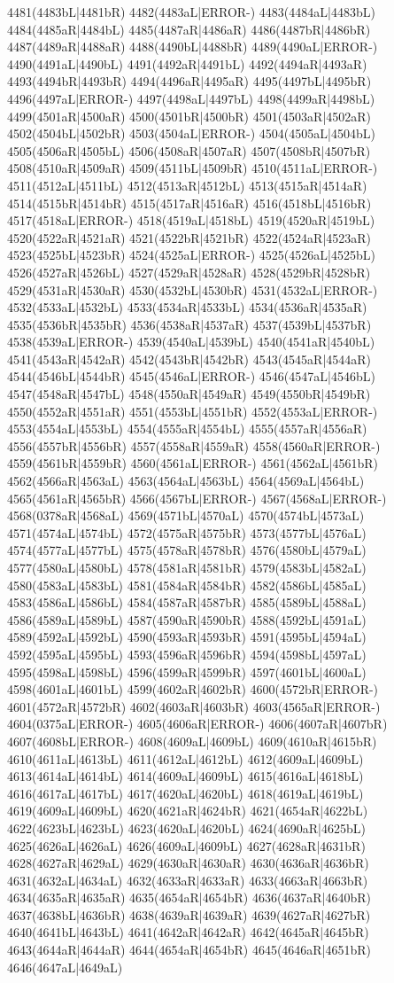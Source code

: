4481(4483bL|4481bR) 4482(4483aL|ERROR-) 4483(4484aL|4483bL) 4484(4485aR|4484bL) 4485(4487aR|4486aR) 4486(4487bR|4486bR) 4487(4489aR|4488aR) 4488(4490bL|4488bR) 4489(4490aL|ERROR-) 4490(4491aL|4490bL) 4491(4492aR|4491bL) 4492(4494aR|4493aR) 4493(4494bR|4493bR) 4494(4496aR|4495aR) 4495(4497bL|4495bR) 4496(4497aL|ERROR-) 4497(4498aL|4497bL) 4498(4499aR|4498bL) 4499(4501aR|4500aR) 4500(4501bR|4500bR) 4501(4503aR|4502aR) 4502(4504bL|4502bR) 4503(4504aL|ERROR-) 4504(4505aL|4504bL) 4505(4506aR|4505bL) 4506(4508aR|4507aR) 4507(4508bR|4507bR) 4508(4510aR|4509aR) 4509(4511bL|4509bR) 4510(4511aL|ERROR-) 4511(4512aL|4511bL) 4512(4513aR|4512bL) 4513(4515aR|4514aR) 4514(4515bR|4514bR) 4515(4517aR|4516aR) 4516(4518bL|4516bR) 4517(4518aL|ERROR-) 4518(4519aL|4518bL) 4519(4520aR|4519bL) 4520(4522aR|4521aR) 4521(4522bR|4521bR) 4522(4524aR|4523aR) 4523(4525bL|4523bR) 4524(4525aL|ERROR-) 4525(4526aL|4525bL) 4526(4527aR|4526bL) 4527(4529aR|4528aR) 4528(4529bR|4528bR) 4529(4531aR|4530aR) 4530(4532bL|4530bR) 4531(4532aL|ERROR-) 4532(4533aL|4532bL) 4533(4534aR|4533bL) 4534(4536aR|4535aR) 4535(4536bR|4535bR) 4536(4538aR|4537aR) 4537(4539bL|4537bR) 4538(4539aL|ERROR-) 4539(4540aL|4539bL) 4540(4541aR|4540bL) 4541(4543aR|4542aR) 4542(4543bR|4542bR) 4543(4545aR|4544aR) 4544(4546bL|4544bR) 4545(4546aL|ERROR-) 4546(4547aL|4546bL) 4547(4548aR|4547bL) 4548(4550aR|4549aR) 4549(4550bR|4549bR) 4550(4552aR|4551aR) 4551(4553bL|4551bR) 4552(4553aL|ERROR-) 4553(4554aL|4553bL) 4554(4555aR|4554bL) 4555(4557aR|4556aR) 4556(4557bR|4556bR) 4557(4558aR|4559aR) 4558(4560aR|ERROR-) 4559(4561bR|4559bR) 4560(4561aL|ERROR-) 4561(4562aL|4561bR) 4562(4566aR|4563aL) 4563(4564aL|4563bL) 4564(4569aL|4564bL) 4565(4561aR|4565bR) 4566(4567bL|ERROR-) 4567(4568aL|ERROR-) 4568(0378aR|4568aL) 4569(4571bL|4570aL) 4570(4574bL|4573aL) 4571(4574aL|4574bL) 4572(4575aR|4575bR) 4573(4577bL|4576aL) 4574(4577aL|4577bL) 4575(4578aR|4578bR) 4576(4580bL|4579aL) 4577(4580aL|4580bL) 4578(4581aR|4581bR) 4579(4583bL|4582aL) 4580(4583aL|4583bL) 4581(4584aR|4584bR) 4582(4586bL|4585aL) 4583(4586aL|4586bL) 4584(4587aR|4587bR) 4585(4589bL|4588aL) 4586(4589aL|4589bL) 4587(4590aR|4590bR) 4588(4592bL|4591aL) 4589(4592aL|4592bL) 4590(4593aR|4593bR) 4591(4595bL|4594aL) 4592(4595aL|4595bL) 4593(4596aR|4596bR) 4594(4598bL|4597aL) 4595(4598aL|4598bL) 4596(4599aR|4599bR) 4597(4601bL|4600aL) 4598(4601aL|4601bL) 4599(4602aR|4602bR) 4600(4572bR|ERROR-) 4601(4572aR|4572bR) 4602(4603aR|4603bR) 4603(4565aR|ERROR-) 4604(0375aL|ERROR-) 4605(4606aR|ERROR-) 4606(4607aR|4607bR) 4607(4608bL|ERROR-) 4608(4609aL|4609bL) 4609(4610aR|4615bR) 4610(4611aL|4613bL) 4611(4612aL|4612bL) 4612(4609aL|4609bL) 4613(4614aL|4614bL) 4614(4609aL|4609bL) 4615(4616aL|4618bL) 4616(4617aL|4617bL) 4617(4620aL|4620bL) 4618(4619aL|4619bL) 4619(4609aL|4609bL) 4620(4621aR|4624bR) 4621(4654aR|4622bL) 4622(4623bL|4623bL) 4623(4620aL|4620bL) 4624(4690aR|4625bL) 4625(4626aL|4626aL) 4626(4609aL|4609bL) 4627(4628aR|4631bR) 4628(4627aR|4629aL) 4629(4630aR|4630aR) 4630(4636aR|4636bR) 4631(4632aL|4634aL) 4632(4633aR|4633aR) 4633(4663aR|4663bR) 4634(4635aR|4635aR) 4635(4654aR|4654bR) 4636(4637aR|4640bR) 4637(4638bL|4636bR) 4638(4639aR|4639aR) 4639(4627aR|4627bR) 4640(4641bL|4643bL) 4641(4642aR|4642aR) 4642(4645aR|4645bR) 4643(4644aR|4644aR) 4644(4654aR|4654bR) 4645(4646aR|4651bR) 4646(4647aL|4649aL) 